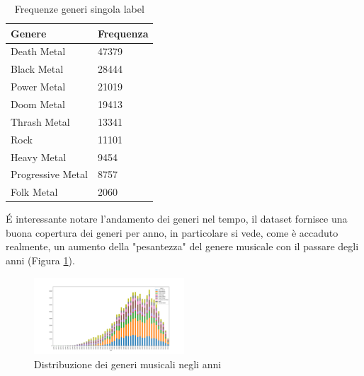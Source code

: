 \documentclass[technote]{IEEEtran}
\begin{document}
\begin{table}[H]
\centering
\caption{Frequenze generi singola label}
\begin{tabular}{|l|l|}
\hline
\textbf{Genere}   & \textbf{Frequenza} \\ \hline
Death Metal       & 47379              \\ \hline
Black Metal       & 28444              \\ \hline
Power Metal       & 21019              \\ \hline
Doom Metal        & 19413              \\ \hline
Thrash Metal      & 13341              \\ \hline
Rock              & 11101              \\ \hline
Heavy Metal       & 9454               \\ \hline
Progressive Metal & 8757               \\ \hline
Folk Metal        & 2060               \\ \hline
\end{tabular}
\label{t_single_genre}
\end{table}
\'E interessante notare l'andamento dei generi nel tempo, il dataset fornisce una buona copertura dei generi per anno, in particolare si vede, come è accaduto realmente, un aumento della "pesantezza" del genere musicale con il passare degli anni (Figura \ref{fig_genre_year}).


\begin{figure}[H]
\centerline{\includegraphics[width=0.5\textwidth]{images/genre_per_year_distribution}}
\caption{Distribuzione dei generi musicali negli anni}
\label{fig_genre_year}
\end{figure}
\end{document}
